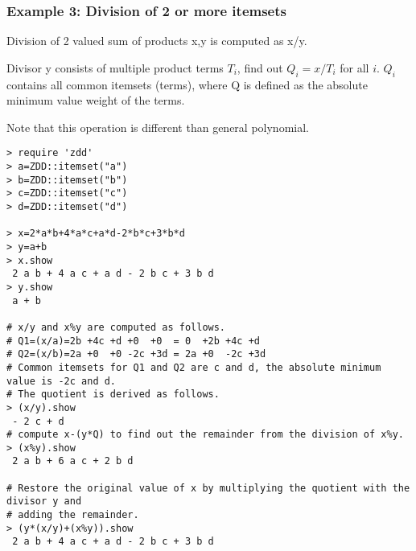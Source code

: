 \subsubsection*{Example 3: Division of 2 or more itemsets}

Division of 2 valued sum of products x,y is computed as x/y.

Divisor y consists of multiple product terms $T_i$, find out $Q_i=x/T_i$ for all $i$.
$Q_i$ contains all common itemsets (terms),
where Q is defined as the absolute minimum value weight of the terms.


Note that this operation is different than general polynomial.


\begin{Verbatim}[baselinestretch=0.7,frame=single]
> require 'zdd'
> a=ZDD::itemset("a")
> b=ZDD::itemset("b")
> c=ZDD::itemset("c")
> d=ZDD::itemset("d")

> x=2*a*b+4*a*c+a*d-2*b*c+3*b*d
> y=a+b
> x.show
 2 a b + 4 a c + a d - 2 b c + 3 b d
> y.show
 a + b

# x/y and x%y are computed as follows.
# Q1=(x/a)=2b +4c +d +0  +0  = 0  +2b +4c +d
# Q2=(x/b)=2a +0  +0 -2c +3d = 2a +0  -2c +3d
# Common itemsets for Q1 and Q2 are c and d, the absolute minimum value is -2c and d.
# The quotient is derived as follows.
> (x/y).show
 - 2 c + d
# compute x-(y*Q) to find out the remainder from the division of x%y.
> (x%y).show
 2 a b + 6 a c + 2 b d

# Restore the original value of x by multiplying the quotient with the divisor y and
# adding the remainder.
> (y*(x/y)+(x%y)).show
 2 a b + 4 a c + a d - 2 b c + 3 b d
\end{Verbatim}
